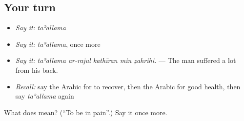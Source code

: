 \subsection*{Your turn}
\begin{itemize}
\raggedright
  \item \emph{Say it:} \emph{taʾallama}
  \item \emph{Say it:} \emph{taʾallama}, once more
  \item \emph{Say it:} \emph{taʾallama ar-rajul kathīran min ẓahrihi.} — The man suffered a lot from his back.
  \item \emph{Recall:} say the Arabic for to recover, then the Arabic for good health, then say \emph{taʾallama} again
\end{itemize}

\begin{tcolorbox}[breakable,colback=teal!4,colframe=teal!35!black,title={Before you move on}]
What does  mean? (\textquotedblleft{}To be in pain\textquotedblright{}.) Say it once more.
\end{tcolorbox}
